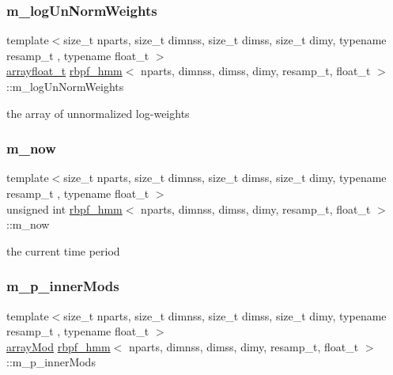 \subsubsection{\texorpdfstring{m\+\_\+log\+Un\+Norm\+Weights}{m\_logUnNormWeights}}
{\footnotesize\ttfamily template$<$size\+\_\+t nparts, size\+\_\+t dimnss, size\+\_\+t dimss, size\+\_\+t dimy, typename resamp\+\_\+t , typename float\+\_\+t $>$ \\
\hyperlink{classrbpf__hmm_aae4e776097278c6e5c25f614d7cad7bd}{arrayfloat\+\_\+t} \hyperlink{classrbpf__hmm}{rbpf\+\_\+hmm}$<$ nparts, dimnss, dimss, dimy, resamp\+\_\+t, float\+\_\+t $>$\+::m\+\_\+log\+Un\+Norm\+Weights\hspace{0.3cm}{\ttfamily [private]}}

the array of unnormalized log-\/weights \mbox{\label{classrbpf__hmm_a1405e1f6ce133cf4d0089bb9cc875d0e}} 
\subsubsection{\texorpdfstring{m\+\_\+now}{m\_now}}
{\footnotesize\ttfamily template$<$size\+\_\+t nparts, size\+\_\+t dimnss, size\+\_\+t dimss, size\+\_\+t dimy, typename resamp\+\_\+t , typename float\+\_\+t $>$ \\
unsigned int \hyperlink{classrbpf__hmm}{rbpf\+\_\+hmm}$<$ nparts, dimnss, dimss, dimy, resamp\+\_\+t, float\+\_\+t $>$\+::m\+\_\+now\hspace{0.3cm}{\ttfamily [private]}}

the current time period \mbox{\label{classrbpf__hmm_a37251f098a509b771e20eae32d779f9d}} 
\subsubsection{\texorpdfstring{m\+\_\+p\+\_\+inner\+Mods}{m\_p\_innerMods}}
{\footnotesize\ttfamily template$<$size\+\_\+t nparts, size\+\_\+t dimnss, size\+\_\+t dimss, size\+\_\+t dimy, typename resamp\+\_\+t , typename float\+\_\+t $>$ \\
\hyperlink{classrbpf__hmm_a6dad2eb9cecbc6a85e348fec442c2998}{array\+Mod} \hyperlink{classrbpf__hmm}{rbpf\+\_\+hmm}$<$ nparts, dimnss, dimss, dimy, resamp\+\_\+t, float\+\_\+t $>$\+::m\+\_\+p\+\_\+inner\+Mods\hspace{0.3cm}{\ttfamily [private]}}

